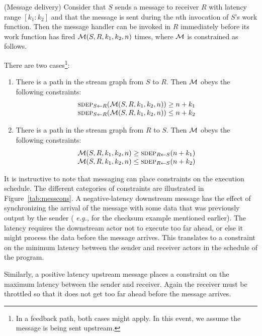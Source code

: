 \begin{definition}(Message delivery)
Consider that $S$ sends a message to receiver $R$ with latency range
$[k_1:k_2]$ and that the message is sent during the $n$th invocation
of $S$'s work function.  Then the message handler can be invoked in
$R$ immediately before its work function has fired ${\cal M}(S, R,
k_1, k_2, n)$ times, where ${\cal M}$ is constrained as follows.

There are two cases\footnote{In a feedback path, both cases might apply.  In this event, we assume the message is being sent upstream.}:
\begin{enumerate}

\item There is a path in the stream graph from $S$ to $R$.  Then
${\cal M}$ obeys the following constraints:
\[
\begin{array}{l}
\sdepf{S}{R}({\cal M}(S, R, k_1, k_2, n)) \ge n+k_1\\
\sdepf{S}{R}({\cal M}(S, R, k_1, k_2, n)) \le n+k_2
\end{array}
\]

\item There is a path in the stream graph from $R$ to $S$.  Then
${\cal M}$ obeys the following constraints:
\[
\begin{array}{l}
{\cal M}(S, R, k_1, k_2, n) \ge \sdepf{R}{S}(n + k_1)\\
{\cal M}(S, R, k_1, k_2, n) \le \sdepf{R}{S}(n + k_2)
\end{array}
\]
\end{enumerate}
\end{definition}

It is instructive to note that messaging can place constraints on the
execution schedule.  The different categories of constraints are
illustrated in Figure~\ref{tab:messcons}.  A negative-latency
downstream message has the effect of synchronizing the arrival of the
message with some data that was previously output by the sender ({\it
e.g.,} for the checksum example mentioned earlier).  The latency
requires the downstream actor not to execute too far ahead, or else it
might process the data before the message arrives.  This translates to
a constraint on the minimum latency between the sender and receiver
actors in the schedule of the program.

Similarly, a positive latency upstream message places a constraint on
the maximum latency between the sender and receiver.  Again the
receiver must be throttled so that it does not get too far ahead
before the message arrives.

